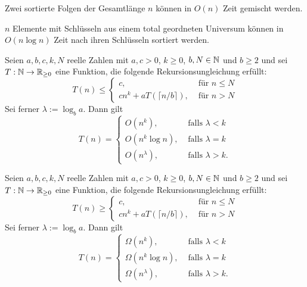 \documentclass{cheat-sheet}
\begin{document}

\begin{alg}
  Zwei sortierte Folgen der Gesamtlänge $n$ können in $O(n)$ Zeit gemischt werden.
\end{alg}

\begin{alg}
  $n$ Elemente mit Schlüsseln aus einem total geordneten Universum können in $O(n \log n)$ Zeit nach ihren Schlüsseln sortiert werden.
\end{alg}

\begin{satz}
  Seien $a, b, c, k, N$ reelle Zahlen mit $a, c > 0$, $k \geq 0$, $b, N \in \mathbb{N}$ und $b \geq 2$ und sei $T : \mathbb{N} \to \mathbb{R}_{\geq 0}$ eine Funktion, die folgende Rekursionsungleichung erfüllt:
  \[ T(n) \leq \begin{cases}
    c, & \text{ für } n \leq N \\
    c n^k + a T(\lceil n / b \rceil), & \text{ für } n > N
  \end{cases} \]
  Sei ferner $\lambda := \log_b a$. Dann gilt
  \[ T(n) = \begin{cases}
    O(n^k), & \text{ falls } \lambda < k \\
    O(n^k \log n), & \text{ falls } \lambda = k \\
    O(n^\lambda), & \text{ falls } \lambda > k.
  \end{cases} \]
\end{satz}

\begin{satz}
  Seien $a, b, c, k, N$ reelle Zahlen mit $a, c > 0$, $k \geq 0$, $b, N \in \mathbb{N}$ und $b \geq 2$ und sei $T : \mathbb{N} \to \mathbb{R}_{\geq 0}$ eine Funktion, die folgende Rekursionsungleichung erfüllt:
  \[ T(n) \geq \begin{cases}
    c, & \text{ für } n \leq N \\
    c n^k + a T(\lceil n / b \rceil), & \text{ für } n > N
  \end{cases} \]
  Sei ferner $\lambda := \log_b a$. Dann gilt
  \[ T(n) = \begin{cases}
    \Omega(n^k), & \text{ falls } \lambda < k \\
    \Omega(n^k \log n), & \text{ falls } \lambda = k \\
    \Omega(n^\lambda), & \text{ falls } \lambda > k.
  \end{cases} \]
\end{satz}
\end{document}
